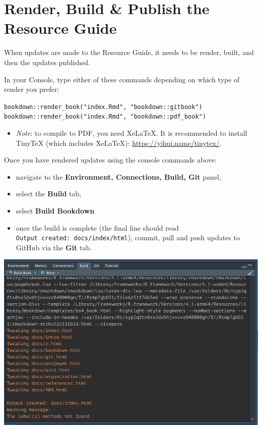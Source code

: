 \documentclass[
]{book}
\providecommand{\tightlist}{%
  \setlength{\itemsep}{0pt}\setlength{\parskip}{0pt}}
\begin{document}
\hypertarget{render-build-publish-the-resource-guide}{%
\section{Render, Build \& Publish the Resource Guide}\label{render-build-publish-the-resource-guide}}

When updates are made to the Resource Guide, it needs to be render, built, and then the updates published.

In your Console, type either of these commands depending on which type of render you prefer:

\texttt{bookdown::render\_book("index.Rmd",\ "bookdown::gitbook")}
\texttt{bookdown::render\_book("index.Rmd",\ "bookdown::pdf\_book")}

\begin{itemize}
\tightlist
\item
  \emph{Note}: to compile to PDF, you need XeLaTeX. It is recommended to install TinyTeX (which includes XeLaTeX): \url{https://yihui.name/tinytex/}.
\end{itemize}

Once you have rendered updates using the console commands above:

\begin{itemize}
\tightlist
\item
  navigate to the \textbf{Environment, Connections, Build, Git} panel,
\item
  select the \textbf{Build} tab,
\item
  select \textbf{Build Bookdown}
\item
  once the build is complete (the final line should read \texttt{Output\ created:\ docs/index/html}), commit, pull and push updates to GitHub via the \textbf{Git} tab.
\end{itemize}

\begin{center}\includegraphics{images/build} \end{center}
\end{document}
